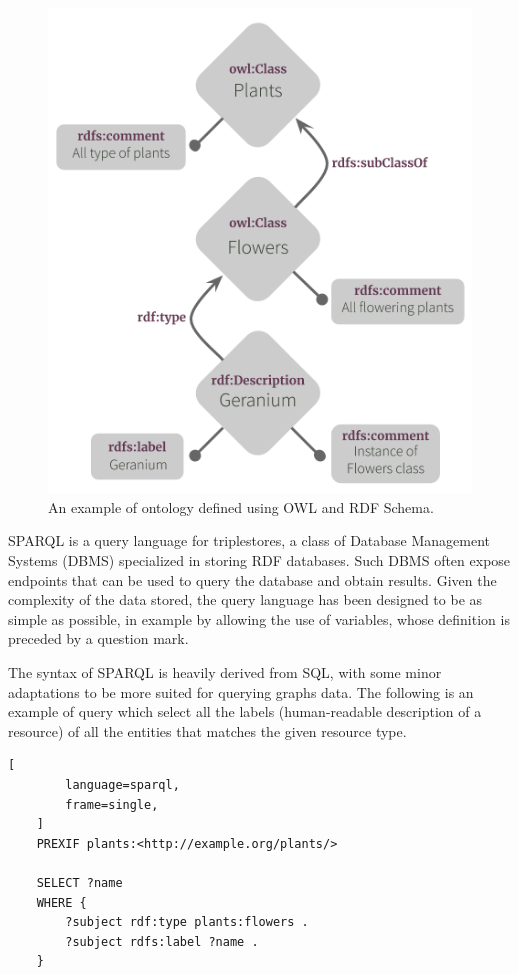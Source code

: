 \documentclass[%
    corpo=13.5pt,
    twoside,
    oldstyle,
    tipotesi=magistrale,
    greek,
    evenboxes
]{toptesi}
\begin{document}
\begin{figure}[ht]
\centering
\includegraphics[scale=0.6]{img/owl-ontology-example.png}
\caption{An example of ontology defined using OWL and RDF Schema.}
\label{fig:owl-ontology-example}
\end{figure}

SPARQL is a query language for triplestores, a class of Database
Management Systems (DBMS) specialized in storing RDF databases. Such DBMS
often expose endpoints that can be used to query the database and obtain
results. Given the complexity of the data stored, the query language has
been designed to be as simple as possible, in example by allowing the use
of variables, whose definition is preceded by a question mark.

The syntax of SPARQL is heavily derived from SQL, with some
minor adaptations to be more suited for querying graphs data. The
following is an example of query which select all the labels
(human-readable description of a resource) of all the entities that
matches the given resource type.

\begin{lstlisting}[
        language=sparql,
        frame=single,
    ]
    PREXIF plants:<http://example.org/plants/>

    SELECT ?name
    WHERE {
        ?subject rdf:type plants:flowers .
        ?subject rdfs:label ?name .
    }
\end{lstlisting}
\end{document}
